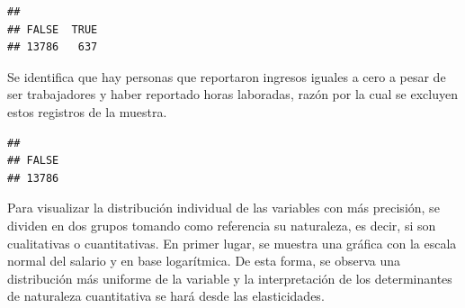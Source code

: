 \documentclass[
]{article}
\newenvironment{Shaded}{\begin{snugshade}}{\end{snugshade}}
\newcommand{\AttributeTok}[1]{\textcolor[rgb]{0.13,0.29,0.53}{#1}}
\newcommand{\DecValTok}[1]{\textcolor[rgb]{0.00,0.00,0.81}{#1}}
\newcommand{\FunctionTok}[1]{\textcolor[rgb]{0.13,0.29,0.53}{\textbf{#1}}}
\newcommand{\NormalTok}[1]{#1}
\newcommand{\OtherTok}[1]{\textcolor[rgb]{0.56,0.35,0.01}{#1}}
\newcommand{\SpecialCharTok}[1]{\textcolor[rgb]{0.81,0.36,0.00}{\textbf{#1}}}
\begin{document}
\begin{Shaded}
\end{Shaded}

\begin{verbatim}
## 
## FALSE  TRUE 
## 13786   637
\end{verbatim}

Se identifica que hay personas que reportaron ingresos iguales a cero a
pesar de ser trabajadores y haber reportado horas laboradas, razón por
la cual se excluyen estos registros de la muestra.

\begin{Shaded}
\end{Shaded}

\begin{verbatim}
## 
## FALSE 
## 13786
\end{verbatim}

Para visualizar la distribución individual de las variables con más
precisión, se dividen en dos grupos tomando como referencia su
naturaleza, es decir, si son cualitativas o cuantitativas. En primer
lugar, se muestra una gráfica con la escala normal del salario y en base
logarítmica. De esta forma, se observa una distribución más uniforme de
la variable y la interpretación de los determinantes de naturaleza
cuantitativa se hará desde las elasticidades.
\end{document}
